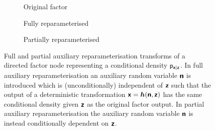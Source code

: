 \begin{figure}[!t]
\centering
\begin{subfigure}[b]{.23\linewidth}
\vskip 0pt
\centering
{}
\caption{Original factor}
\label{sfig:reparam-factor-original}
\end{subfigure}%
\hspace*{\fill}
\begin{subfigure}[b]{.32\linewidth}
\vskip 0pt
\centering
{}
\caption{Fully reparameterised}
\label{sfig:reparam-factor-full}
\end{subfigure}%
\hspace*{\fill}
\begin{subfigure}[b]{.37\linewidth}
\vskip 0pt
\centering
{}
\caption{Partially reparameterised}
\label{sfig:reparam-factor-partial}
\end{subfigure}%
\caption[Auxiliary reparameterisations of a directed factor.]{Full and partial auxiliary reparameterisation transforms of a directed factor node representing a conditional density $\mathsf{p}_{\boldsymbol{\mathsf{x}}|\boldsymbol{\mathsf{z}}}$. In full auxiliary reparameterisation an auxiliary random variable $\boldsymbol{\mathsf{n}}$ is introduced which is (unconditionally) independent of $\boldsymbol{\mathsf{z}}$ such that the output of a deterministic transformation $\boldsymbol{\mathsf{x}} = \boldsymbol{h}(\boldsymbol{\mathsf{n}},\boldsymbol{\mathsf{z}})$ has the same conditional density given $\boldsymbol{\mathsf{z}}$ as the original factor output. In partial auxiliary reparameterisation the auxiliary random variable $\boldsymbol{\mathsf{n}}$ is instead conditionally dependent on $\boldsymbol{\mathsf{z}}$.
}
\label{fig:factor-node-reparameterisation}
\end{figure}

